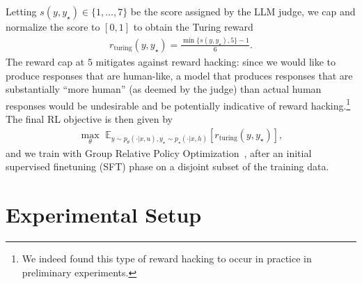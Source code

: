 \documentclass[11pt]{article}
\newcommand{\llq}[1]{{\color{cyan}[linlu: #1]}}
\begin{document}
Letting $s({y, y_\star}) \in \{1, \dots, 7\}$ be the score assigned by the LLM judge, we cap and  normalize the score to $[0,1]$ to obtain the Turing reward 
\begin{align*}
r_{\mathrm{turing}} (y, y_\star) =  \frac{\min\{s(y, y_{\star}), 5\} -1}{6}.
\end{align*}
The reward cap at $5$ mitigates against reward hacking: since we would like to produce responses that are human-like, a model that produces responses that are substantially ``more human'' (as deemed by the judge) than actual human responses would be undesirable and  be potentially indicative of reward hacking.\footnote{We indeed found this type of reward hacking to occur in practice in preliminary experiments.}
The final RL objective is then given by
\begin{align*}
    \max_\theta \,\, \mathbb{E}_{y \sim p_\theta(\cdot | x, u), y_\star \sim p_\star(\cdot | x, h)}\left[ r_{\text{turing}} (y, y_\star) \right],
\end{align*}
and we train with Group Relative Policy Optimization~\citep[GRPO;][]{shao2024deepseekmath}, after an initial supervised finetuning (SFT) phase on a disjoint subset of the training data.



\section{Experimental Setup}
\end{document}

